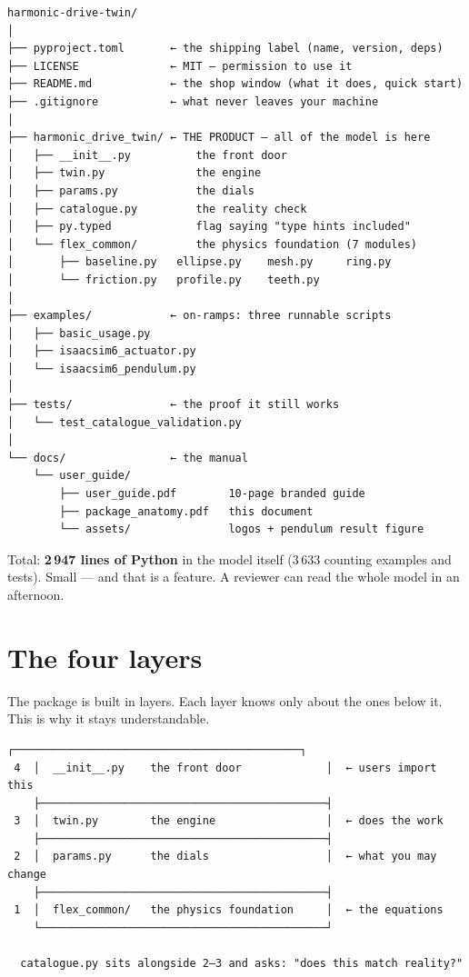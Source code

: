 \documentclass[11pt,a4paper]{article}
\begin{document}
\begin{Verbatim}[fontsize=\footnotesize,xleftmargin=6pt]
harmonic-drive-twin/
│
├── pyproject.toml       ← the shipping label (name, version, deps)
├── LICENSE              ← MIT — permission to use it
├── README.md            ← the shop window (what it does, quick start)
├── .gitignore           ← what never leaves your machine
│
├── harmonic_drive_twin/ ← THE PRODUCT — all of the model is here
│   ├── __init__.py          the front door
│   ├── twin.py              the engine
│   ├── params.py            the dials
│   ├── catalogue.py         the reality check
│   ├── py.typed             flag saying "type hints included"
│   └── flex_common/         the physics foundation (7 modules)
│       ├── baseline.py   ellipse.py    mesh.py     ring.py
│       └── friction.py   profile.py    teeth.py
│
├── examples/            ← on-ramps: three runnable scripts
│   ├── basic_usage.py
│   ├── isaacsim6_actuator.py
│   └── isaacsim6_pendulum.py
│
├── tests/               ← the proof it still works
│   └── test_catalogue_validation.py
│
└── docs/                ← the manual
    └── user_guide/
        ├── user_guide.pdf        10-page branded guide
        ├── package_anatomy.pdf   this document
        └── assets/               logos + pendulum result figure
\end{Verbatim}

Total: \textbf{2\,947 lines of Python} in the model itself (3\,633 counting
examples and tests). Small --- and that is a feature. A reviewer can read the
whole model in an afternoon.

\section{The four layers}

The package is built in layers. Each layer knows only about the ones below it.
This is why it stays understandable.

\begin{Verbatim}[fontsize=\small,xleftmargin=20pt]
    ┌────────────────────────────────────────────┐
 4  │  __init__.py    the front door             │  ← users import this
    ├────────────────────────────────────────────┤
 3  │  twin.py        the engine                 │  ← does the work
    ├────────────────────────────────────────────┤
 2  │  params.py      the dials                  │  ← what you may change
    ├────────────────────────────────────────────┤
 1  │  flex_common/   the physics foundation     │  ← the equations
    └────────────────────────────────────────────┘

  catalogue.py sits alongside 2–3 and asks: "does this match reality?"
\end{Verbatim}
\end{document}
